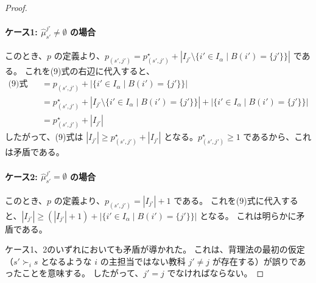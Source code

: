\documentclass[12pt, a4paper]{article}
\theoremstyle{definition}
\theoremstyle{remark}
\theoremstyle{plain}
\begin{document}
\begin{proof}
\paragraph{ケース1: \(\widehat{\mu}_{s'}^{j'} \neq \emptyset\) の場合}
このとき、$p$ の定義より、$p_{(s',j')} = p^\star_{(s',j')} + |I_{j'}\setminus \{i' \in I_\alpha \mid B(i') = \{j'\}\}|$ である。
これを(9)式の右辺に代入すると、
\begin{align*}
    \text{(9)式の右辺} &= p_{(s',j')} + | \{i' \in I_{\alpha} \mid B(i') = \{j'\}\} | \\
    &= p^\star_{(s',j')} + |I_{j'}\setminus \{i' \in I_\alpha \mid B(i') = \{j'\}\}| + | \{i' \in I_{\alpha} \mid B(i') = \{j'\}\} | \\
    &= p^\star_{(s',j')} + |I_{j'}|
\end{align*}
したがって、(9)式は $|I_{j'}| \geq p^\star_{(s',j')} + |I_{j'}|$ となる。$p^\star_{(s',j')} \geq 1$ であるから、これは矛盾である。

\paragraph{ケース2: \(\widehat{\mu}_{s'}^{j'} = \emptyset\) の場合}
このとき、$p$ の定義より、$p_{(s',j')} = |I_{j'}| + 1$ である。
これを(9)式に代入すると、$|I_{j'}| \geq (|I_{j'}| + 1) + | \{i' \in I_{\alpha} \mid B(i') = \{j'\}\}|$ となる。
これは明らかに矛盾である。

\vspace{\baselineskip}
ケース1、2のいずれにおいても矛盾が導かれた。
これは、背理法の最初の仮定（$s' \succ_i s$ となるような \(i\) の主担当ではない教科 \(j' \neq j\) が存在する）が誤りであったことを意味する。
したがって、$j' = j$ でなければならない。




\end{proof}
\end{document}
